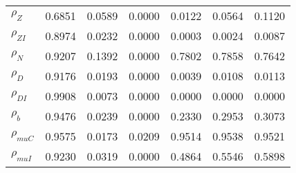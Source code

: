 \begin{center}
\begin{longtable}{lcccccc}
$ {\rho_Z}             $	 & 	          0.6851	 & 	          0.0589	 & 	          0.0000	 & 	          0.0122	 & 	          0.0564	 & 	          0.1120 \\ 
$ {\rho_{ZI}}          $	 & 	          0.8974	 & 	          0.0232	 & 	          0.0000	 & 	          0.0003	 & 	          0.0024	 & 	          0.0087 \\ 
$ {\rho_N}             $	 & 	          0.9207	 & 	          0.1392	 & 	          0.0000	 & 	          0.7802	 & 	          0.7858	 & 	          0.7642 \\ 
$ {\rho_D}             $	 & 	          0.9176	 & 	          0.0193	 & 	          0.0000	 & 	          0.0039	 & 	          0.0108	 & 	          0.0113 \\ 
$ {\rho_{DI}}          $	 & 	          0.9908	 & 	          0.0073	 & 	          0.0000	 & 	          0.0000	 & 	          0.0000	 & 	          0.0000 \\ 
$ {\rho_b}             $	 & 	          0.9476	 & 	          0.0239	 & 	          0.0000	 & 	          0.2330	 & 	          0.2953	 & 	          0.3073 \\ 
$ {\rho_{muC}}         $	 & 	          0.9575	 & 	          0.0173	 & 	          0.0209	 & 	          0.9514	 & 	          0.9538	 & 	          0.9521 \\ 
$ {\rho_{muI}}         $	 & 	          0.9230	 & 	          0.0319	 & 	          0.0000	 & 	          0.4864	 & 	          0.5546	 & 	          0.5898 \\ 
\end{longtable}
 \end{center}
